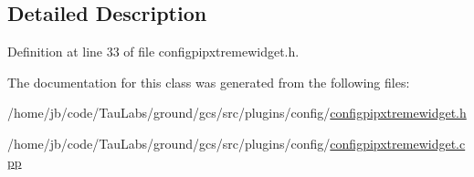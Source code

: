 \subsection{\-Detailed \-Description}


\-Definition at line 33 of file configpipxtremewidget.\-h.



\-The documentation for this class was generated from the following files\-:\begin{DoxyCompactItemize}
\item 
/home/jb/code/\-Tau\-Labs/ground/gcs/src/plugins/config/\hyperlink{configpipxtremewidget_8h}{configpipxtremewidget.\-h}\item 
/home/jb/code/\-Tau\-Labs/ground/gcs/src/plugins/config/\hyperlink{configpipxtremewidget_8cpp}{configpipxtremewidget.\-cpp}\end{DoxyCompactItemize}
